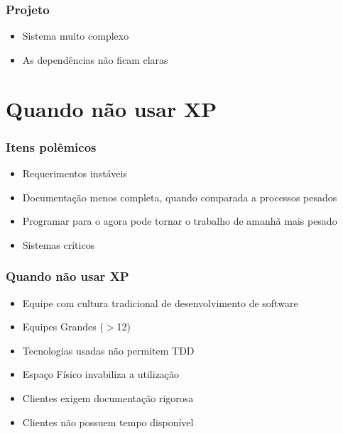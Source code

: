 \documentclass[10pt]{beamer}
\begin{document}
\begin{frame}
  \frametitle{Projeto}
  \begin{itemize}
  \item Sistema muito complexo
  \item As dependências não ficam claras
  \end{itemize}
\end{frame}

\section{Quando não usar XP}


\begin{frame}
  \frametitle{Itens polêmicos}
  \begin{itemize}
  \item Requerimentos instáveis
  \item Documentação menos completa, quando comparada a processos pesados
  \item Programar para o agora pode tornar o trabalho de amanhã mais pesado
  \item Sistemas críticos
  \end{itemize}
\end{frame}


\begin{frame}
  \frametitle{Quando não usar XP}
  \begin{itemize}
  \item Equipe com cultura tradicional de desenvolvimento de software
  \item Equipes Grandes ($>$12)
  \item Tecnologias usadas não permitem TDD
  \item Espaço Físico invabiliza a utilização
  \item Clientes exigem documentação rigorosa
  \item Clientes não possuem tempo disponível
  \end{itemize}
\end{frame}

\end{document}
